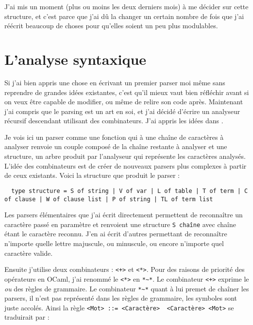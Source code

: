 \documentclass{article}
\begin{document}
J'ai mis un moment (plus ou moins les deux derniers mois) à me décider sur cette structure, et c'est parce que j'ai dû la changer un certain nombre de fois que j'ai réécrit beaucoup de choses pour qu'elles soient un peu plus modulables.

\section{L'analyse syntaxique}

Si j'ai bien appris une chose en écrivant un premier parser moi même sans reprendre de grandes idées existantes, c'est qu'il mieux vaut bien réfléchir avant si on veux être capable de modifier, ou même de relire son code après. Maintenant j'ai compris que le parsing est un art en soi, et j'ai décidé d'écrire un analyseur récursif descendant utilisant des combinateurs. J'ai appris les idées dans \cite{Ljunglof}.

Je vois ici un parser comme une fonction qui à une chaîne de caractères à analyser renvoie un couple composé de la chaîne restante à analyser et une structure, un arbre produit par l'analyseur qui représente les caractères analysés. L'idée des combinateurs est de créer de nouveaux parsers plus complexes à partir de ceux existants. Voici la structure que produit le parser :

\begin{verbatim}
  type structure = S of string | V of var | L of table | T of term | C of clause | W of clause list | P of string | TL of term list
\end{verbatim}

Les parsers élémentaires que j'ai écrit directement permettent de reconnaître un caractère passé en paramètre et renvoient une structure \texttt{S\ chaîne} avec chaîne étant le caractère reconnu. J'en ai écrit d'autres permettant de reconnaître n'importe quelle lettre majuscule, ou minuscule, ou encore n'importe quel caractère valide.

Ensuite j'utilise deux combinateurs : \texttt{<+>} et \texttt{<*>}. Pour des raisons de priorité des opérateurs en OCaml, j'ai renommé le \texttt{<*>} en \texttt{*\textasciitilde{}*}. Le combinateur \texttt{<+>} exprime le \emph{ou} \texttt{\textbar{}} des règles de grammaire. Le combinateur \texttt{*\textasciitilde{}*} quant à lui premet de chaîner les parsers, il n'est pas représenté dans les règles de grammaire, les symboles sont juste accolés. Ainsi la règle \texttt{<Mot>\ ::=\ <Caractère>\ \textbar{}\ \textless{}Caractère>\ \textless{}Mot>} se traduirait par :
\end{document}
